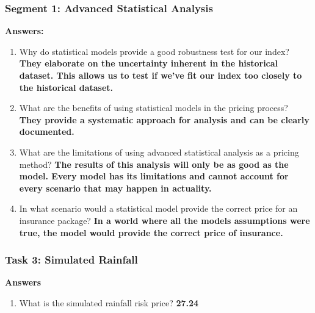 \documentclass[letterpaper,10pt,english]{sphinxmanual}
\begin{document}
\subsubsection{Segment 1: Advanced Statistical Analysis}
\label{wiiet/wiiet_initialtomarketpricinganskey:segment-1-advanced-statistical-analysis}
\textbf{Answers:}
\begin{enumerate}
\item {} 
Why do statistical models provide a good robustness test for our index? \textbf{They elaborate on the uncertainty inherent in the historical dataset. This allows us to test if we've fit our index too closely to the historical dataset.}

\item {} 
What are the benefits of using statistical models in the pricing process? \textbf{They provide a systematic approach for analysis and can be clearly documented.}

\item {} 
What are the limitations of using advanced statistical analysis as a pricing method? \textbf{The results of this analysis will only be as good as the model. Every model has its limitations and cannot account for every scenario that may happen in actuality.}

\item {} 
In what scenario would a statistical model provide the correct price for an insurance package? \textbf{In a world where all the models assumptions were true, the model would provide the correct price of insurance.}

\end{enumerate}


\subsubsection{Task 3: Simulated Rainfall}
\label{wiiet/wiiet_initialtomarketpricinganskey:task-3-simulated-rainfall}
\textbf{Answers}
\begin{enumerate}
\item {} 
What is the simulated rainfall risk price? \textbf{27.24}

\end{enumerate}
\end{document}
